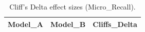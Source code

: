 \begin{table}[t]
\centering
\begin{tabular}{lll}
\toprule
Model_A & Model_B & Cliffs_Delta \\
\midrule
\bottomrule
\end{tabular}
\caption{Cliff's Delta effect sizes (Micro_Recall).}
\label{tab:cliffs_Micro_Recall}
\end{table}